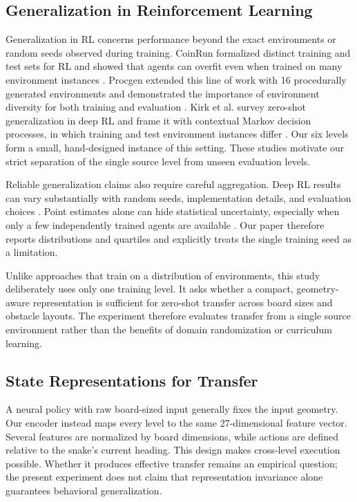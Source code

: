 \documentclass[journal]{IEEEtran}
\begin{document}
\subsection{Generalization in Reinforcement Learning}

Generalization in RL concerns performance beyond the exact environments or
random seeds observed during training. CoinRun formalized distinct training and
test sets for RL and showed that agents can overfit even when trained on many
environment instances \cite{cobbe2019quantifying}. Procgen extended this line of
work with 16 procedurally generated environments and demonstrated the importance
of environment diversity for both training and evaluation
\cite{cobbe2020leveraging}. Kirk et al. survey zero-shot generalization in deep
RL and frame it with contextual Markov decision processes, in which training and
test environment instances differ \cite{kirk2023survey}. Our six levels form a
small, hand-designed instance of this setting. These studies motivate our strict
separation of the single source level from unseen evaluation levels.

Reliable generalization claims also require careful aggregation. Deep RL results
can vary substantially with random seeds, implementation details, and evaluation
choices \cite{henderson2018deep}. Point estimates alone can hide statistical
uncertainty, especially when only a few independently trained agents are
available \cite{agarwal2021deep}. Our paper therefore reports distributions and
quartiles and explicitly treats the single training seed as a limitation.

Unlike approaches that train on a distribution of environments, this study
deliberately uses only one training level. It asks whether a compact,
geometry-aware representation is sufficient for zero-shot transfer across
board sizes and obstacle layouts. The experiment therefore evaluates transfer
from a single source environment rather than the benefits of domain
randomization or curriculum learning.

\subsection{State Representations for Transfer}

A neural policy with raw board-sized input generally fixes the input geometry.
Our encoder instead maps every level to the same 27-dimensional feature vector.
Several features are normalized by board dimensions, while actions are defined
relative to the snake's current heading. This design makes cross-level execution
possible. Whether it produces effective transfer remains an empirical question;
the present experiment does not claim that representation invariance alone
guarantees behavioral generalization.
\end{document}
